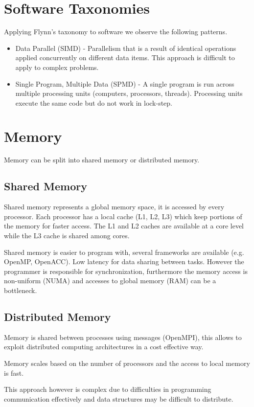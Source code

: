 \section{Software Taxonomies}

Applying Flynn's taxonomy to software we observe the following patterns.

\begin{itemize}
    \item Data Parallel (SIMD) - Parallelism that is a result of identical operations applied concurrently on different data items. This approach is difficult to apply to complex problems.
    \item Single Program, Multiple Data (SPMD) - A single program is run across multiple processing units (computers, processors, threads). Processing units execute the same code but do not work in lock-step.
\end{itemize}

\section{Memory}

Memory can be split into shared memory or distributed memory.

\subsection{Shared Memory}

Shared memory represents a global memory space, it is accessed by every processor.
Each processor has a local cache (L1, L2, L3) which keep portions of the memory for faster access.
The L1 and L2 caches are available at a core level while the L3 cache is shared among cores.

Shared memory is easier to program with, several frameworks are available (e.g. OpenMP, OpenACC).
Low latency for data sharing between tasks.
However the programmer is responsible for synchronization, furthermore the memory access is non-uniform (NUMA) and accesses to global memory (RAM) can be a bottleneck.

\subsection{Distributed Memory}

Memory is shared between processes using messages (OpenMPI), this allows to exploit distributed computing architectures in a cost effective way.

Memory scales based on the number of processors and the access to local memory is fast.

This approach however is complex due to difficulties in programming communication effectively and data structures may be difficult to distribute.
